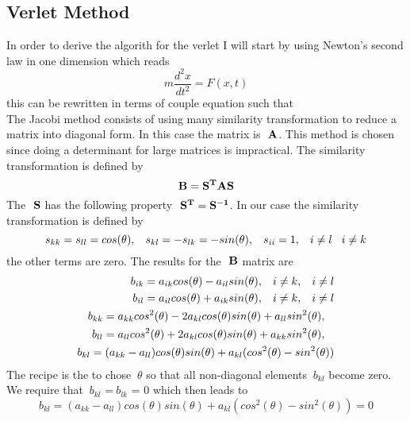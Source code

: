 \documentclass[11pt,a4wide]{article}
\begin{document}
\subsection{Verlet Method}
In order to derive the algorith for the verlet I will start by using Newton's second law  in one dimension which reads
\[
	m\frac{d^2x}{dt^2} = F(x,t) 
\]
this can be rewritten in terms of couple equation such that 
\[
	
\]
The Jacobi method consists of using many similarity transformation to reduce a matrix into diagonal form. In this case the matrix is $\ {\bf A}$. This method is chosen since doing a determinant for large matrices is impractical. The similarity transformation is defined by 
\[
	{\bf B} ={\bf S^{T}AS}
\]
The $\ {\bf S}$ has the following property $\ {\bf S^T}={\bf S^{-1}}$. In our case the similarity transformation is defined by 
\[
	s_{kk} =s_{ll}=cos(\theta), \hspace{0.3cm} s_{kl}=-s_{lk}=-sin(\theta), \hspace{0.3cm} s_{ii} =1 , \hspace{0.3cm} 
	 i \neq l \hspace{0.3cm} i \neq k
\]
the other terms are zero. The results for the $\ {\bf B}$ matrix are 
\begin{equation}
\begin{split}
 	b_{ik}=a_{ik}cos(\theta) -a_{il}sin(\theta), \hspace{0.3cm} i \neq k, \hspace{0.3cm} i \neq l \\
 	b_{il}=a_{il}cos(\theta)+a_{ik}sin(\theta), \hspace{0.3cm} i \neq k, \hspace{0.3cm} i \neq l \\
 	b_{kk}=a_{kk}cos^2(\theta) -2a_{kl}cos(\theta)sin(\theta) +a_{ll}sin^2(\theta), \hspace{0.3cm} \\
 	b_{ll}=a_{ll}cos^2(\theta)+2a_{kl}cos(\theta)sin(\theta) +a_{kk}sin^2(\theta), \hspace{0.3cm} \\
 	b_{kl}=(a_{kk} - a_{ll})cos(\theta)sin(\theta) +a_{kl}(cos^2(\theta) -sin^2(\theta))   \\
\end{split}
\end{equation}
The recipe is the to chose $\ \theta$ so that all non-diagonal elements $\ b_{kl}$ become zero. We require that $\ b_{kl}$ =$\ b_{lk}$ = 0 which then leads to 
\[
	b_{kl}=(a_{kk} - a_{ll})cos(\theta)sin(\theta) +a_{kl}(cos^2(\theta) -sin^2(\theta))=0	
\]
\end{document}
